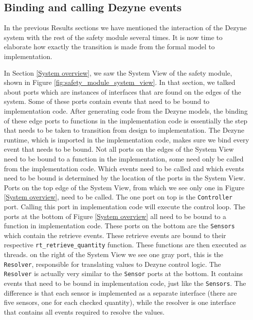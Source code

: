 \documentclass[12pt]{scrreprt}
\begin{document}
\subsection{Binding and calling Dezyne events}
\label{Binding Dezyne events to functions}
In the previous Results sections we have mentioned the interaction of the Dezyne system with the rest of the safety module several times. It is now time to elaborate how exactly the transition is made from the formal model to implementation.
\par
In Section \ref{System overview}, we saw the System View of the safety module, shown in Figure \ref{fig:safety_module_system_view}. In that section, we talked about ports which are instances of interfaces that are found on the edges of the system. Some of these ports contain events that need to be bound to implementation code. After generating code from the Dezyne models, the binding of these edge ports to functions in the implementation code is essentially the step that needs to be taken to transition from design to implementation. The Dezyne runtime, which is imported in the implementation code, makes sure we bind every event that needs to be bound. Not all ports on the edges of the System View need to be bound to a function in the implementation, some need only be called from the implementation code. Which events need to be called and which events need to be bound is determined by the location of the ports in the System View. Ports on the top edge of the System View, from which we see only one in Figure \ref{System overview}, need to be called. The one port on top is the \texttt{Controller} port. Calling this port in implementation code will execute the control loop. The ports at the bottom of Figure \ref{System overview} all need to be bound to a function in implementation code. These ports on the bottom are the \texttt{Sensors} which contain the retrieve events. These retrieve events are bound to their respective \texttt{rt\_retrieve\_quantity} function. These functions are then executed as threads. on the right of the System View we see one gray port, this is the \texttt{Resolver}, responsible for translating values to Dezyne control logic. The \texttt{Resolver} is actually very similar to the \texttt{Sensor} ports at the bottom. It contains events that need to be bound in implementation code, just like the \texttt{Sensors}. The difference is that each sensor is implemented as a separate interface (there are five sensors, one for each checked quantity), while the resolver is one interface that contains all events required to resolve the values.
\end{document}
